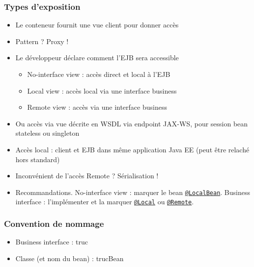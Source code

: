 \documentclass[english, french]{beamer}
\begin{document}
\begin{frame}
	\frametitle{Types d’exposition}
	\begin{itemize}
		\item Le conteneur fournit une vue client pour donner accès
		\item Pattern ? \pause Proxy ! \pause
		\item Le développeur déclare comment l’EJB sera accessible
		\begin{itemize}
			\item No-interface view : accès direct et local à l’EJB
			\item Local view : accès local via une interface \og{}business\fg{}
			\item Remote view : accès via une interface \og{}business\fg{}
		\end{itemize}
		\item {\tiny Ou accès via vue décrite en WSDL via endpoint JAX-WS, pour session bean stateless ou singleton}
		\item Accès local : client et EJB dans même application Java EE {\tiny (peut être relaché hors standard)}
		\item Inconvénient de l’accès Remote ? \pause Sérialisation !\pause
		\item Recommandations. No-interface view : marquer le bean \href{https://docs.oracle.com/javaee/7/api/javax/ejb/LocalBean.html}{\texttt{@LocalBean}}. Business interface : l’implémenter et la marquer \href{https://docs.oracle.com/javaee/7/api/javax/ejb/Local.html}{\texttt{@Local}} ou \href{https://docs.oracle.com/javaee/7/api/javax/ejb/Remote.html}{\texttt{@Remote}}.
	\end{itemize}
\end{frame}

\begin{frame}
	\frametitle{Convention de nommage}
	\begin{itemize}
		\item Business interface : truc
		\item Classe (et nom du bean) : trucBean
	\end{itemize}
\end{frame}
\end{document}
